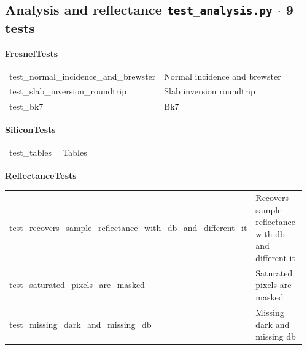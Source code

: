 \subsection{Analysis and reflectance \hfill \normalfont\small\color{soft2}\texttt{test\_analysis.py} $\cdot$ 9 tests}
\par\smallskip \textbf{FresnelTests}\par\nopagebreak\smallskip
\begin{longtable}{@{}>{\ttfamily\scriptsize\raggedright\arraybackslash}p{0.40\linewidth} >{\footnotesize\raggedright\arraybackslash}p{0.555\linewidth}@{}}
test\_\allowbreak{}normal\_\allowbreak{}incidence\_\allowbreak{}and\_\allowbreak{}brewster & Normal incidence and brewster \\
test\_\allowbreak{}slab\_\allowbreak{}inversion\_\allowbreak{}roundtrip & Slab inversion roundtrip \\
test\_\allowbreak{}bk7 & Bk7 \\
\end{longtable}
\par\smallskip \textbf{SiliconTests}\par\nopagebreak\smallskip
\begin{longtable}{@{}>{\ttfamily\scriptsize\raggedright\arraybackslash}p{0.40\linewidth} >{\footnotesize\raggedright\arraybackslash}p{0.555\linewidth}@{}}
test\_\allowbreak{}tables & Tables \\
\end{longtable}
\par\smallskip \textbf{ReflectanceTests}\par\nopagebreak\smallskip
\begin{longtable}{@{}>{\ttfamily\scriptsize\raggedright\arraybackslash}p{0.40\linewidth} >{\footnotesize\raggedright\arraybackslash}p{0.555\linewidth}@{}}
test\_\allowbreak{}recovers\_\allowbreak{}sample\_\allowbreak{}reflectance\_\allowbreak{}with\_\allowbreak{}db\_\allowbreak{}and\_\allowbreak{}different\_\allowbreak{}it & Recovers sample reflectance with db and different it \\
test\_\allowbreak{}saturated\_\allowbreak{}pixels\_\allowbreak{}are\_\allowbreak{}masked & Saturated pixels are masked \\
test\_\allowbreak{}missing\_\allowbreak{}dark\_\allowbreak{}and\_\allowbreak{}missing\_\allowbreak{}db & Missing dark and missing db \\
\end{longtable}
